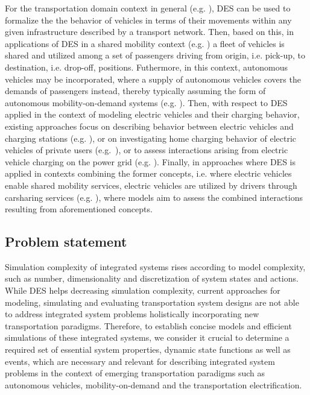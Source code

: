 \documentclass[graybox]{svmult}
\begin{document}
For the transportation domain context in general (e.g. \cite{burghout2006discrete}), DES can be used to formalize the the behavior of vehicles in terms of their movements within any given infrastructure described by a transport network. Then, based on this, in applications of DES in a shared mobility context (e.g. \cite{clemente2013discrete}) a fleet of vehicles is shared and utilized among a set of passengers driving from origin, i.e. pick-up, to destination, i.e. drop-off, positions. Futhermore, in this context, autonomous vehicles may be incorporated, where a supply of autonomous vehicles covers the demands of passengers instead, thereby typically assuming the form of autonomous mobility-on-demand systems (e.g. \cite{jager2018multi, gurumurthy2021system}).
Then, with respect to DES applied in the context of modeling electric vehicles and their charging behavior, existing approaches focus on describing behavior between electric vehicles and charging stations (e.g. \cite{lebeau2013implementing}), or on investigating home charging behavior of electric vehicles of private users (e.g.~\cite{lopez2021modeling}), or to assess interactions arising from electric vehicle charging on the power grid (e.g.  \cite{darabi2013event, ferro2019predictive}).
Finally, in approaches where DES is applied in contexts combining the former concepts, i.e. where electric vehicles enable shared mobility services, electric vehicles are utilized by drivers through carsharing services (e.g. \cite{fanti2017fleet, hamroun2020modelling, li2021simulation}), where models aim to assess the combined interactions resulting from aforementioned concepts.

\subsection{Problem statement}

Simulation complexity of integrated systems rises according to model complexity, such as number, dimensionality and discretization of system states and actions. While DES helps decreasing simulation complexity, current approaches for modeling, simulating and evaluating transportation system designs are not able to address integrated system problems holistically incorporating new transportation paradigms.
Therefore, to establish concise models and efficient simulations of these integrated systems, we consider it crucial to determine a required set of essential system properties, dynamic state functions as well as events, which are necessary and relevant for describing integrated system problems in the context of emerging transportation paradigms such as autonomous vehicles, mobility-on-demand and the transportation electrification.
\end{document}
